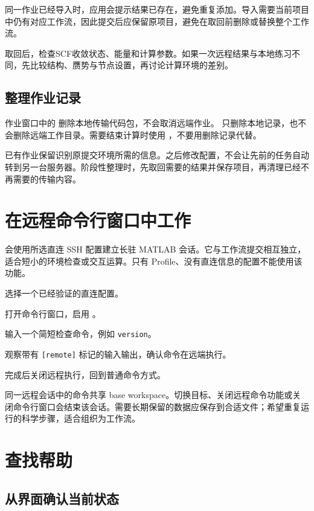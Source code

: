 同一作业已经导入时，应用会提示结果已存在，避免重复添加。导入需要当前项目中仍有对应工作流，因此提交后应保留原项目，避免在取回前删除或替换整个工作流。

取回后，检查SCF收敛状态、能量和计算参数。如果一次远程结果与本地练习不同，先比较结构、赝势与节点设置，再讨论计算环境的差别。

\subsection{整理作业记录}

作业窗口中的  删除本地传输代码包，不会取消远端作业。 只删除本地记录，也不会删除远端工作目录。需要结束计算时使用 ，不要用删除记录代替。

已有作业保留识别原提交环境所需的信息。之后修改配置，不会让先前的任务自动转到另一台服务器。阶段性整理时，先取回需要的结果并保存项目，再清理已经不再需要的传输内容。

\section{在远程命令行窗口中工作}

 会使用所选直连 SSH 配置建立长驻 MATLAB\regmark{} 会话。它与工作流提交相互独立，适合短小的环境检查或交互运算。只有 Profile、没有直连信息的配置不能使用该功能。

\begin{steps}
\item 选择一个已经验证的直连配置。
\item 打开命令行窗口，启用 。
\item 输入一个简短检查命令，例如 \texttt{version}。
\item 观察带有 \texttt{[remote]} 标记的输入输出，确认命令在远端执行。
\item 完成后关闭远程执行，回到普通命令方式。
\end{steps}

同一远程会话中的命令共享 base workspace。切换目标、关闭远程命令功能或关闭命令行窗口会结束该会话。需要长期保留的数据应保存到合适文件；希望重复运行的科学步骤，适合组织为工作流。

\section{查找帮助}

\subsection{从界面确认当前状态}

